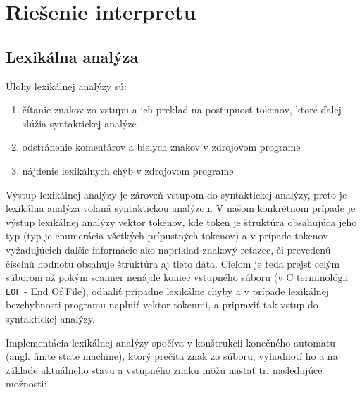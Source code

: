 \documentclass[12pt,a4paper,titlepage,final]{article}
\begin{document}
\pagestyle{plain}
\tableofcontents

\newpage
\pagestyle{plain}
\setcounter{page}{1}


\section{Riešenie interpretu} \label{Riesenie interpretu}

\subsection{Lexikálna analýza}
Úlohy lexikálnej analýzy sú:
\begin{enumerate}
    \itemsep0em
    \item čítanie znakov zo vstupu a ich preklad na postupnosť tokenov, ktoré ďalej slúžia syntaktickej analýze
    \item odstránenie komentárov a bielych znakov v zdrojovom programe
    \item nájdenie lexikálnych chýb v zdrojovom programe
\end{enumerate}

Výstup lexikálnej analýzy je zároveň vstupom do syntaktickej analýzy, preto je
lexikálna analýza volaná syntaktickou analýzou. V našom konkrétnom prípade je
výstup lexikálnej analýzy vektor tokenov, kde token je štruktúra obsahujúca
jeho typ (typ je enumerácia všetkých prípustných tokenov)
a v prípade tokenov vyžadujúcich dalšie informácie ako napríklad znakový reťazec,
či prevedenú číselnú hodnotu obsahuje štruktúra aj tieto dáta.
Cieľom je teda prejsť celým súborom až pokým scanner nenájde koniec vstupného súboru
(v C terminológii \texttt{EOF} - End Of File), odhaliť prípadne lexikálne chyby a
v prípade lexikálnej bezchybnosti programu naplniť vektor tokenmi, a pripraviť
tak vstup do syntaktickej analýzy.

Implementácia lexikálnej analýzy spočíva v konštrukcii konečného automatu
(angl. finite state machine), ktorý prečíta znak zo súboru, vyhodnotí
ho a na základe aktuálneho stavu a vstupného znaku môžu nastať tri nasledujúce
možnosti:
\end{document}
